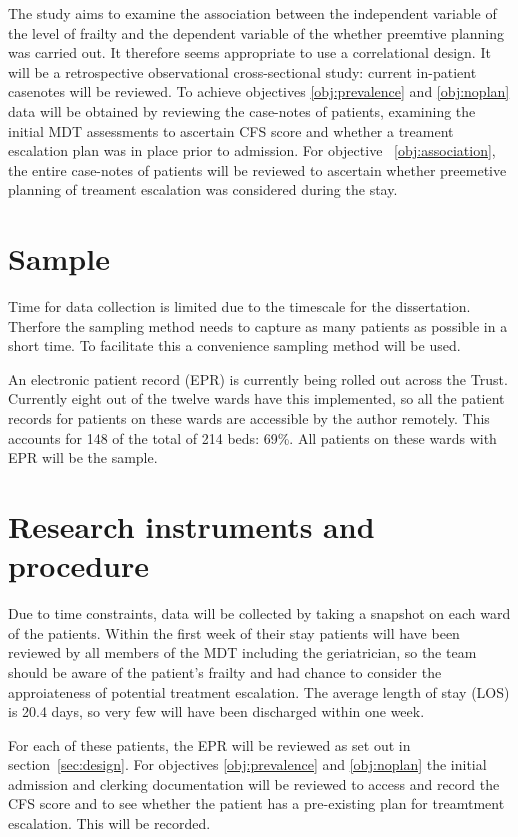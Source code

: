 \documentclass
[
	12pt,
	a4paper,
	oneside,
]{article}
\begin{document}
The study aims to examine the association between the independent variable of 
the level of frailty and the dependent variable of the whether preemtive planning
was carried out. It therefore seems appropriate to use a correlational design. 
It will be a retrospective observational 
cross-sectional study: current in-patient casenotes will be reviewed. To achieve objectives \ref{obj:prevalence}
and \ref{obj:noplan} data will be obtained by reviewing the case-notes
of patients, examining the initial MDT assessments to ascertain CFS score and 
whether a treament escalation plan was in place prior to admission. For objective~
\ref{obj:association}, the entire case-notes of patients will be reviewed to ascertain
whether preemetive planning of treament escalation was considered during the stay.

\section{Sample}
Time for data collection is limited due to the timescale for the dissertation. 
Therfore the sampling method needs to capture as many patients as possible in a 
short time. To facilitate this a convenience sampling method will be used.

An electronic patient record (EPR) is currently being rolled out across the Trust.
Currently eight out of the twelve wards have this implemented, so all the patient 
records for patients on these wards are accessible by the author remotely. This
accounts for 148 of the total of 214 beds: 69\%. All patients on these wards with
EPR will be the sample.


\section{Research instruments and procedure}
\label{sec:procedure}
Due to time constraints, data will be collected by taking a snapshot on each ward 
of the patients. Within the first week of their stay patients will have been reviewed
by all members of the MDT including the geriatrician, so the team should be aware 
of the patient's frailty and had chance to consider the approiateness of potential 
treatment escalation. The average length of stay (LOS) is 20.4 days, so very few 
will have been discharged within one week.

For each of these patients, the EPR will be reviewed as set out in 
section~\ref{sec:design}. For objectives \ref{obj:prevalence} and \ref{obj:noplan} 
the initial admission and clerking documentation will be reviewed to access and 
record the CFS score and to see whether the patient has a pre-existing plan 
for treamtment escalation. This will be recorded.
\end{document}
